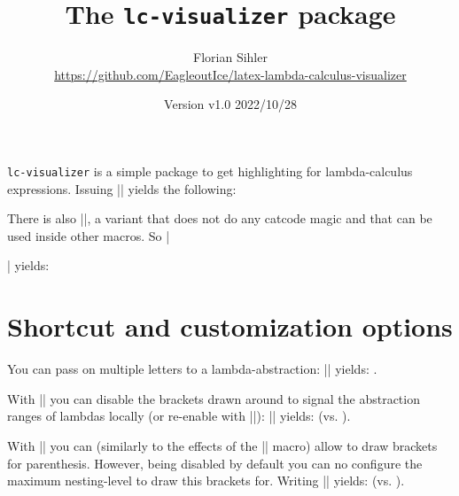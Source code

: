 \documentclass[parskip=half,english,numbers=noenddot,footnotes=nomultiple,oneside]{scrartcl}
\title{The \texttt{lc-visualizer} package}
\author{%
	\texorpdfstring{Florian Sihler\medskip\\[-2mm]
		{\scriptsize\url{https://github.com/EagleoutIce/latex-lambda-calculus-visualizer}}%
	}{Florian Sihler}}
\date{Version v1.0 \textendash{} 2022/10/28}
\begin{document}
   \maketitle

	\texttt{lc-visualizer} is a simple package to get highlighting for lambda-calculus expressions.
   Issuing || yields the following:


   There is also |\RLC|, a variant that does not do any catcode magic and that can be used inside other macros. So |\centerline{\RLC{\Y \equiv \\f\.\(\\x\.\f \(\x \x\)\) \(\\x\.\f \(\x \x\)\)}}| yields:

   \centerline{\RLC{\Y \equiv \\f\.\(\\x\.\f \(\x \x\)\) \(\\x\.\f \(\x \x\)\)}}

   \section{Shortcut and customization options}
      You can pass on multiple letters to a lambda-abstraction: || yields: .

      With |\lcDisableLambdaRanges| you can disable the brackets drawn around to signal the abstraction ranges of lambdas locally (or re-enable with |\lcEnableLambdaRanges|):
      |{\lcDisableLambdaRanges{}}| yields: {\lcDisableLambdaRanges{}} (vs. ).

      With |\lcMaximumParenthesisRangeDrawDepth| you can (similarly to the effects of the |\lcDisableLambdaRanges| macro) allow to draw brackets for parenthesis.
      However, being disabled by default you can no configure the maximum nesting-level to draw this brackets for.
      Writing |{\lcDisableLambdaRanges{}}| yields: {\lcDisableLambdaRanges{}} (vs. {\lcDisableLambdaRanges{}}).
\end{document}
